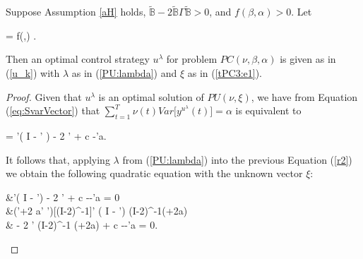 \begin{theorem} \label{t:PC3} 
	Suppose Assumption \ref{aH} holds, $ \tilde{\mathbb{B}} - 
	2 \tilde{\mathbb{B}} \Gamma \tilde{\mathbb{B}} > 0$, and 
	$ f(\beta,\alpha) > 0$.
	Let
	\begin{flalign} \label{tPC3:e1}
		\xi = f(\beta,\alpha) \beta.
	\end{flalign}
	Then an optimal control strategy $u^{\lambda}$ for problem 	
	$PC(\nu,\beta,\alpha)$ is given as in (\ref{u_k}) with $\lambda$ as in 
	(\ref{PU:lambda}) and $\xi$ as in (\ref{tPC3:e1}).
\end{theorem}

\begin{proof}
	Given that $u^{\lambda}$ is an optimal solution of $PU(\nu,\xi)$,
	we have from Equation (\ref{eq:SvarVector}) that 
	$\sum_{t=1}^{T} \nu(t)Var\bigl[ y^{u^{\lambda}}(t)  \bigr]  = \alpha$ 
	is equivalent to 
	\begin{flalign} \label{r2}	
		\alpha = \lambda'\left(  I - 
		' \right)\lambda  
		- 2 \eta' \lambda + c -\eta'a.
	\end{flalign}
	
	It follows that, applying $\lambda$ from (\ref{PU:lambda}) into the previous 
	Equation (\ref{r2})  %
	we obtain the following quadratic equation with the unknown vector $\xi$:
	\begin{flalign} \label{r3}
		&\lambda'\left(  I - '\right)\lambda  
			- 2 \eta' \lambda + c -\alpha -\eta'a = 0 \Leftrightarrow 
			\nonumber \\
		&(\xi'+2 a' \Gamma')[(I-2\Gamma{})^{-1}]' 
		 \left(  I -	 '\right)
		 (I-2\Gamma{})^{-1}(\xi+2\Gamma a)  \nonumber \\	
		& \qquad - 2 \eta' (I-2\Gamma{})^{-1}
		 (\xi+2\Gamma a)  + c -\alpha -\eta'a = 0.
	\end{flalign}
			

\end{proof}
